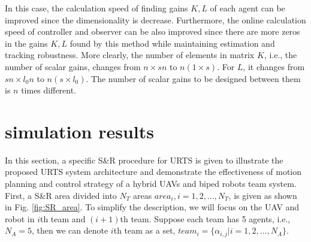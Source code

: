 \documentclass{ieeeaccess}
\newtheorem{remark}{Remark}
\begin{document}
In this case, the calculation speed of finding gains $K,L$ of each agent can be improved since the dimensionality is decrease. Furthermore, the online calculation speed of controller and observer can be also improved since there are more zeros in the gains $K,L$ found by this method while maintaining estimation and tracking robustness. More clearly, the number of elements in matrix $K$, i.e., the number of scalar gains, changes from $n\times sn$ to $n(1\times s)$. For $L$, it changes from $sn\times l_0n$ to $n(s\times l_0)$. The number of scalar gains to be designed between them is $n$ times different.

\section{simulation results}
In this section, a specific S\&R procedure for URTS is given to illustrate the proposed URTS system architecture and demonstrate the effectiveness of motion planning and control strategy of a hybrid UAVs and biped robots team system. First, a S\&R area divided into $N_T$ areas $area_i,i=1,2,...,N_T$, is given as shown in Fig. \ref{fig:SR_area}. To simplify the description, we will focus on the UAV and robot in $i$th team and $(i+1)$th team. Suppose each team has 5 agents, i.e., $N_A=5$, then we can denote $i$th team as a set, $team_i=\{ \alpha_{i,j} | i=1,2,...,N_A \}$.
\end{document}
